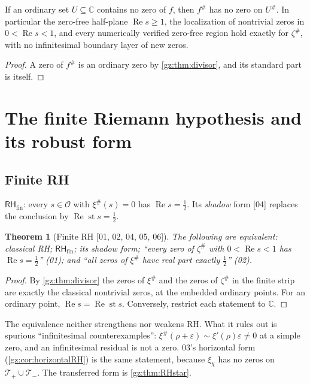 \documentclass[11pt,a4paper]{article}
\numberwithin{equation}{section}
\newtheorem{theorem}{Theorem}[section]
\theoremstyle{definition}
\theoremstyle{remark}
\newcommand{\C}{\mathbb C}
\newcommand{\OO}{\mathcal O}
\newcommand{\eps}{\varepsilon}
\renewcommand{\Re}{\operatorname{Re}}
\newcommand{\st}{\operatorname{st}}
\newcommand{\RH}{\mathsf{RH}}
\newcommand{\zp}{\zeta^{\#}}
\newcommand{\xip}{\xi^{\#}}
\newcommand{\Tp}{\mathcal T_{+}}
\newcommand{\Tm}{\mathcal T_{-}}
\newcommand{\src}[1]{\textup{[#1]}}
\begin{document}
\begin{corollary}[Zero-free halos \src{06}]\label{gz:cor:halofree}
If an ordinary set $U\subseteq\C$ contains no zero of $f$, then $f^\#$ has
no zero on $U^\#$. In particular the zero-free half-plane $\Re s\ge1$, the
localization of nontrivial zeros in $0<\Re s<1$, and every numerically
verified zero-free region hold exactly for $\zp$, with no infinitesimal
boundary layer of new zeros.
\end{corollary}
\begin{proof}
A zero of $f^\#$ is an ordinary zero by \cref{gz:thm:divisor}, and its
standard part is itself.
\end{proof}

\section{The finite Riemann hypothesis and its robust form}\label{gz:sec:robust}

\subsection{Finite RH}
\begin{definition}[\src{04, 05, 06}]\label{gz:def:RHfin}
$\RH_{\mathrm{fin}}$: every $s\in\OO$ with $\xip(s)=0$ has $\Re s=\tfrac12$.
Its \emph{shadow} form \src{04} replaces the conclusion by $\Re\st s=\tfrac12$.
\end{definition}

\begin{theorem}[Finite RH \src{01, 02, 04, 05, 06}]\label{gz:thm:finiteRH}
The following are equivalent: classical RH; $\RH_{\mathrm{fin}}$; its shadow
form; ``every zero of $\zp$ with $0<\Re s<1$ has $\Re s=\tfrac12$'' (01); and
``all zeros of $\xip$ have real part exactly $\tfrac12$'' (02).
\end{theorem}
\begin{proof}
By \cref{gz:thm:divisor} the zeros of $\xip$ and the zeros of $\zp$ in the
finite strip are exactly the classical nontrivial zeros, at the embedded
ordinary points. For an ordinary point, $\Re s=\Re\st s$. Conversely,
restrict each statement to $\C$.
\end{proof}
The equivalence neither strengthens nor weakens RH. What it rules out is
spurious ``infinitesimal counterexamples'': $\xip(\rho+\eps)\sim\xi'(\rho)\eps\ne0$
at a simple zero, and an infinitesimal residual is not a zero. 03's
horizontal form (\cref{gz:cor:horizontalRH}) is the same statement,
because $\xi_\chi$ has no zeros on $\Tp\cup\Tm$. The transferred form is
\cref{gz:thm:RHstar}.
\end{document}
